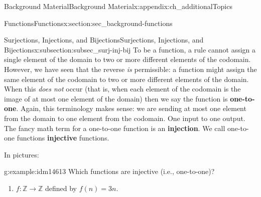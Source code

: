 \documentclass[oneside,10pt,]{book}
\newcommand{\terminology}[1]{\textbf{#1}}
\numberwithin{equation}{chapter}
\def\Z{\mathbb Z}
\begin{document}
\begin{appendixptx}{Background Material}{}{Background Material}{}{}{x:appendix:ch_additionalTopics}
\begin{sectionptx}{Functions}{}{Functions}{}{}{x:section:sec_background-functions}
\begin{subsectionptx}{Surjections, Injections, and Bijections}{}{Surjections, Injections, and Bijections}{}{}{x:subsection:subsec_surj-inj-bij}
To be a function, a rule cannot assign a single element of the domain to two or more different elements of the codomain. However, we have seen that the reverse \emph{is} permissible: a function might assign the same element of the codomain to two or more different elements of the domain. When this \emph{does not} occur (that is, when each element of the codomain is the image of at most one element of the domain) then we say the function is \terminology{one-to-one}. Again, this terminology makes sense: we are sending at most one element from the domain to one element from the codomain. One input to one output. The fancy math term for a one-to-one function is an \terminology{injection}. We call one-to-one functions \terminology{injective} functions.%
\par
In pictures:%
\begin{sidebyside}{2}{0.05}{0.05}{0.1}%
\begin{sbspanel}{0.4}%
%
\end{sbspanel}%
\begin{sbspanel}{0.4}%
%
\end{sbspanel}%
\end{sidebyside}%
\begin{example}{}{g:example:idm14613}%
Which functions are injective (i.e., one-to-one)?%
\par
%
\begin{enumerate}
\item{}\(f:\Z \to \Z\) defined by \(f(n) = 3n\).%

\end{enumerate}
\end{example}
\end{subsectionptx}
\end{sectionptx}
\end{appendixptx}
\end{document}
